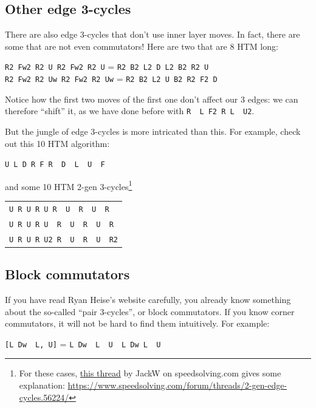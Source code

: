 \documentclass[11pt,a4paper]{book}
\newcommand{\p}{\textquotesingle}
\newcommand{\m}{\texttt}
\newcommand{\ps}{\p\,\,}
\begin{document}
\subsection{Other edge 3-cycles}
\label{other-edge}

There are also edge 3-cycles that don't use inner layer moves. In fact, there are some that are not even commutators! Here are two that are 8 HTM long:

\begin{center}
\m{R2 Fw2 R2 U R2 Fw2 R2 U} = \m{R2 B2 L2 D L2 B2 R2 U}\\
\m{R2 Fw2 R2 Uw R2 Fw2 R2 Uw} = \m{R2 B2 L2 U B2 R2 F2 D}
\end{center}

Notice how the first two moves of the first one don't affect our 3 edges: we can therefore ``shift'' it, as we have done before with \m{R\ps L F2 R L\ps U2}.

But the jungle of edge 3-cycles is more intricated than this. For example, check out this 10 HTM algorithm:

\begin{center}
\m{U L D R F R\ps D\ps L\ps U\ps F\p}
\end{center}

and some 10 HTM 2-gen 3-cycles\footnote{For these cases, \href{https://www.speedsolving.com/forum/threads/2-gen-edge-cycles.56224/}{this thread} by JackW on speedsolving.com gives some explanation: \url{https://www.speedsolving.com/forum/threads/2-gen-edge-cycles.56224/}}

\begin{center}
\begin{tabular}{l}
\m{U R U R U R\ps U\ps R\ps U\ps R\p}\\
\m{U R U R U\ps R\ps U\ps R\ps U\ps R}\\
\m{U R U R U2 R\ps U\ps R\ps U\ps R2}
\end{tabular}
\end{center}

\subsection{Block commutators}

If you have read Ryan Heise's website carefully, you already know something about the so-called ``pair 3-cycles'', or block commutators. If you know corner commutators, it will not be hard to find them intuitively. For example:

\begin{center}
\m{[L Dw\ps L\p, U\p]} = \m{L Dw\ps L\ps U\ps L Dw L\ps U}
\end{center}
\end{document}
